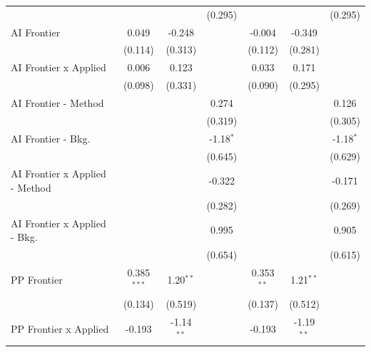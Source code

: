 \begin{tabular}{lcccccc}
                                  &               &                & (0.295)       &               &               & (0.295)\\   
   AI Frontier                    & 0.049         & -0.248         &               & -0.004        & -0.349        &   \\   
                                  & (0.114)       & (0.313)        &               & (0.112)       & (0.281)       &   \\   
   AI Frontier x Applied          & 0.006         & 0.123          &               & 0.033         & 0.171         &   \\   
                                  & (0.098)       & (0.331)        &               & (0.090)       & (0.295)       &   \\   
   AI Frontier - Method           &               &                & 0.274         &               &               & 0.126\\   
                                  &               &                & (0.319)       &               &               & (0.305)\\   
   AI Frontier - Bkg.             &               &                & -1.18$^{*}$   &               &               & -1.18$^{*}$\\   
                                  &               &                & (0.645)       &               &               & (0.629)\\   
   AI Frontier x Applied - Method &               &                & -0.322        &               &               & -0.171\\   
                                  &               &                & (0.282)       &               &               & (0.269)\\   
   AI Frontier x Applied - Bkg.   &               &                & 0.995         &               &               & 0.905\\   
                                  &               &                & (0.654)       &               &               & (0.615)\\   
   PP Frontier                    & 0.385$^{***}$ & 1.20$^{**}$    &               & 0.353$^{**}$  & 1.21$^{**}$   &   \\   
                                  & (0.134)       & (0.519)        &               & (0.137)       & (0.512)       &   \\   
   PP Frontier x Applied          & -0.193        & -1.14$^{**}$   &               & -0.193        & -1.19$^{**}$  &   \\   

\end{tabular}
